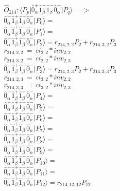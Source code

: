 \documentclass[14pt]{article}
\begin{document}
    $\hat{O}_{214}:  \langle{P_p}\vert \hat{0}_{\alpha}^{+}\hat{1}_{\beta}^{+}\hat{1}_{\beta}^{-}\hat{0}_{\alpha}^{-} \vert{P_q}\rangle => $ \\ 
    $ \hat{0}_{\alpha}^{+}\hat{1}_{\beta}^{+}\hat{1}_{\beta}^{-}\hat{0}_{\alpha}^{-} \vert{P_{0}}\rangle =  $ \\ 
    $ \hat{0}_{\alpha}^{+}\hat{1}_{\beta}^{+}\hat{1}_{\beta}^{-}\hat{0}_{\alpha}^{-} \vert{P_{1}}\rangle =  $ \\ 
    $ \hat{0}_{\alpha}^{+}\hat{1}_{\beta}^{+}\hat{1}_{\beta}^{-}\hat{0}_{\alpha}^{-} \vert{P_{2}}\rangle = {r}_{214,2,2}P_{2}+{r}_{214,3,2}P_{3} $ \\ 
    ${r}_{214,2,2}\ =\ {ci}_{2,2}*{inv}_{2,2} $ \\ 
    ${r}_{214,3,2}\ =\ {ci}_{2,2}*{inv}_{2,3} $ \\ 
    $ \hat{0}_{\alpha}^{+}\hat{1}_{\beta}^{+}\hat{1}_{\beta}^{-}\hat{0}_{\alpha}^{-} \vert{P_{3}}\rangle = {r}_{214,2,3}P_{2}+{r}_{214,3,3}P_{3} $ \\ 
    ${r}_{214,2,3}\ =\ {ci}_{3,2}*{inv}_{2,2} $ \\ 
    ${r}_{214,3,3}\ =\ {ci}_{3,2}*{inv}_{2,3} $ \\ 
    $ \hat{0}_{\alpha}^{+}\hat{1}_{\beta}^{+}\hat{1}_{\beta}^{-}\hat{0}_{\alpha}^{-} \vert{P_{4}}\rangle =  $ \\ 
    $ \hat{0}_{\alpha}^{+}\hat{1}_{\beta}^{+}\hat{1}_{\beta}^{-}\hat{0}_{\alpha}^{-} \vert{P_{5}}\rangle =  $ \\ 
    $ \hat{0}_{\alpha}^{+}\hat{1}_{\beta}^{+}\hat{1}_{\beta}^{-}\hat{0}_{\alpha}^{-} \vert{P_{6}}\rangle =  $ \\ 
    $ \hat{0}_{\alpha}^{+}\hat{1}_{\beta}^{+}\hat{1}_{\beta}^{-}\hat{0}_{\alpha}^{-} \vert{P_{7}}\rangle =  $ \\ 
    $ \hat{0}_{\alpha}^{+}\hat{1}_{\beta}^{+}\hat{1}_{\beta}^{-}\hat{0}_{\alpha}^{-} \vert{P_{8}}\rangle =  $ \\ 
    $ \hat{0}_{\alpha}^{+}\hat{1}_{\beta}^{+}\hat{1}_{\beta}^{-}\hat{0}_{\alpha}^{-} \vert{P_{9}}\rangle =  $ \\ 
    $ \hat{0}_{\alpha}^{+}\hat{1}_{\beta}^{+}\hat{1}_{\beta}^{-}\hat{0}_{\alpha}^{-} \vert{P_{10}}\rangle =  $ \\ 
    $ \hat{0}_{\alpha}^{+}\hat{1}_{\beta}^{+}\hat{1}_{\beta}^{-}\hat{0}_{\alpha}^{-} \vert{P_{11}}\rangle =  $ \\ 
    $ \hat{0}_{\alpha}^{+}\hat{1}_{\beta}^{+}\hat{1}_{\beta}^{-}\hat{0}_{\alpha}^{-} \vert{P_{12}}\rangle = {r}_{214,12,12}P_{12} $ \\ 
\end{document}
